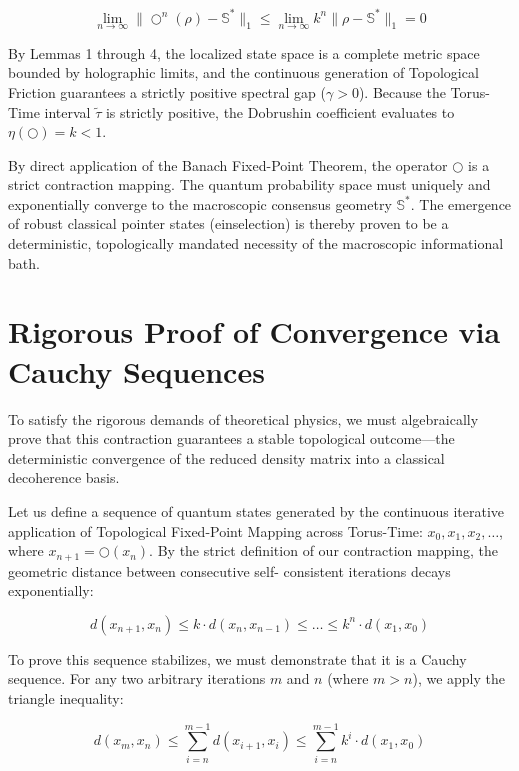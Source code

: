 \documentclass[12pt,openany]{book}
\theoremstyle{plain}
\theoremstyle{definition}
\theoremstyle{remark}
\begin{document}
$$\lim_{n \to \infty} \|\bigcirc^n(\rho) - \mathbb{S}^*\|_1 \le \lim_{n \to \infty} k^n \|\rho - \mathbb{S}^*\|_1 = 0$$

By Lemmas 1 through 4, the localized state space is a complete metric space bounded by holographic limits, and the continuous generation of Topological Friction guarantees a strictly positive spectral gap ($\gamma > 0$). Because the Torus-Time interval $\tilde{\tau}$ is strictly positive, the Dobrushin coefficient evaluates to $\eta(\bigcirc) = k < 1$. 

By direct application of the Banach Fixed-Point Theorem, the operator $\bigcirc$ is a strict contraction mapping. The quantum probability space must uniquely and exponentially converge to the macroscopic consensus geometry $\mathbb{S}^*$. The emergence of robust classical pointer states (einselection) is thereby proven to be a deterministic, topologically mandated necessity of the macroscopic informational bath.

\section{Rigorous Proof of Convergence via Cauchy Sequences}

To satisfy the rigorous demands of theoretical physics, we must algebraically prove that this contraction guarantees a stable topological outcome—the deterministic convergence of the reduced density matrix into a classical decoherence basis. 

Let us define a sequence of quantum states generated by the continuous iterative application of Topological Fixed-Point Mapping across Torus-Time: $x_0, x_1, x_2, \dots$, where $x_{n+1} = \bigcirc(x_n)$. By the strict definition of our contraction mapping, the geometric distance between consecutive self- consistent iterations decays exponentially:

\begin{equation}
d(x_{n+1}, x_n) \le k \cdot d(x_n, x_{n-1}) \le \dots \le k^n \cdot d(x_1, x_0)
\end{equation}

To prove this sequence stabilizes, we must demonstrate that it is a Cauchy sequence. For any two arbitrary iterations $m$ and $n$ (where $m > n$), we apply the triangle inequality:

\begin{equation}
d(x_m, x_n) \le \sum_{i=n}^{m-1} d(x_{i+1}, x_i) \le \sum_{i=n}^{m-1} k^i \cdot d(x_1, x_0)
\end{equation}
\end{document}
